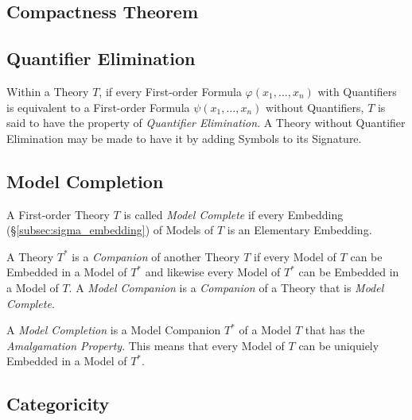 \documentclass{article}
\begin{document}
\subsection{Compactness Theorem}


\subsection{Quantifier Elimination}

Within a Theory $T$, if every First-order Formula $\varphi(x_1,
\ldots, x_n)$ with Quantifiers is equivalent to a First-order Formula
$\psi(x_1, \ldots, x_n)$ without Quantifiers, $T$ is said to have the
property of \emph{Quantifier Elimination}. A Theory without Quantifier
Elimination may be made to have it by adding Symbols to its Signature.

\subsection{Model Completion}\label{subsec:model_completion}

A First-order Theory $T$ is called \emph{Model Complete} if every
Embedding (\S\ref{subsec:sigma_embedding}) of Models of $T$ is an
Elementary Embedding.

A Theory $T^*$ is a \emph{Companion} of another Theory $T$ if every
Model of $T$ can be Embedded in a Model of $T^*$ and likewise every
Model of $T^*$ can be Embedded in a Model of $T$. A \emph{Model
  Companion} is a \emph{Companion} of a Theory that is \emph{Model
  Complete}.

A \emph{Model Completion} is a Model Companion $T^*$ of a Model $T$
that has the \emph{Amalgamation Property}. This means that every Model
of $T$ can be uniquiely Embedded in a Model of $T^*$.

\subsection{Categoricity}
\end{document}

